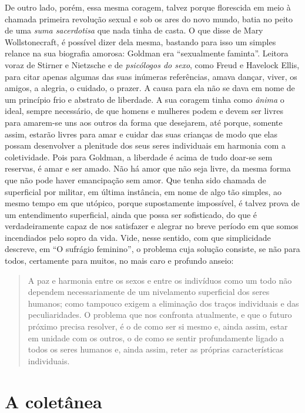 De outro lado, porém, essa mesma coragem, talvez porque florescida em
meio à chamada primeira revolução sexual e sob os ares do novo mundo,
batia no peito de uma \textit{suma sacerdotisa} que nada tinha de casta. O que
disse de Mary Wollstonecraft, é possível dizer dela mesma, bastando para
isso um simples relance na sua biografia amorosa: Goldman era
``sexualmente faminta''. Leitora voraz de Stirner e Nietzsche e de
\textit{psicólogos do sexo}, como Freud e Havelock Ellis, para citar apenas
algumas das suas inúmeras referências, amava dançar, viver, os amigos, a
alegria, o cuidado, o prazer. A causa para ela não se dava em nome de um
princípio frio e abstrato de liberdade. A sua coragem tinha como
\textit{ânima} o ideal, sempre necessário, de que homens e mulheres podem e
devem ser livres para amarem-se uns aos outros da forma que desejarem,
até porque, somente assim, estarão livres para amar e cuidar das suas
crianças de modo que elas possam desenvolver a plenitude dos seus seres
individuais em harmonia com a coletividade. Pois para Goldman, a
liberdade é acima de tudo doar-se sem reservas, é amar e ser amado. Não
há amor que não seja livre, da mesma forma que não pode haver
emancipação sem amor. Que tenha sido chamada de superficial por militar,
em última instância, em nome de algo tão simples, ao mesmo tempo em que
utópico, porque supostamente impossível, é talvez prova de um
entendimento superficial, ainda que possa ser sofisticado, do que é
verdadeiramente capaz de nos satisfazer e alegrar no breve período em
que somos incendiados pelo sopro da vida. Vide, nesse sentido, com que
simplicidade descreve, em ``O sufrágio feminino'', o problema cuja
solução consiste, se não para todos, certamente para muitos, no mais
caro e profundo anseio:

\begin{quote}
A paz e harmonia entre os sexos e entre os indivíduos como um todo não
dependem necessariamente de um nivelamento superficial dos seres
humanos; como tampouco exigem a eliminação dos traços individuais e das
peculiaridades. O problema que nos confronta atualmente, e que o futuro
próximo precisa resolver, é o de como ser si mesmo e, ainda assim, estar
em unidade com os outros, o de como se sentir profundamente ligado a
todos os seres humanos e, ainda assim, reter as próprias características
individuais.
\end{quote}

\section{A coletânea}

